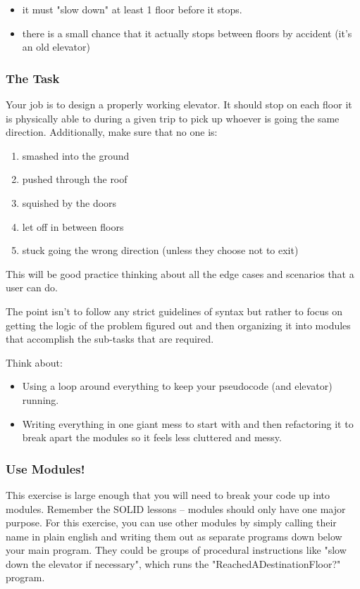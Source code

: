 \documentclass[11pt]{article}
\begin{document}
\begin{itemize}
\item it must "slow down" at least 1 floor before it stops.
\item there is a small chance that it actually stops between floors by 
accident (it's an old elevator)
\end{itemize}

\subsubsection{The Task}
\label{sec-12-1-2}

Your job is to design a properly working elevator. It should stop on each 
floor it is physically able to during a given trip to pick up whoever is 
going the same direction. Additionally, make sure that no one is:

\begin{enumerate}
\item smashed into the ground
\item pushed through the roof
\item squished by the doors
\item let off in between floors
\item stuck going the wrong direction (unless they choose not to exit)
\end{enumerate}


This will be good practice thinking about all the edge cases and scenarios 
that a user can do.

The point isn't to follow any strict guidelines of syntax but rather to 
focus on getting the logic of the problem figured out and then organizing it
into modules that accomplish the sub-tasks that are required.

Think about:

\begin{itemize}
\item Using a loop around everything to keep your pseudocode (and elevator) 
running.
\item Writing everything in one giant mess to start with and then refactoring it
to break apart the modules so it feels less cluttered and messy.
\end{itemize}

\subsubsection{Use Modules!}
\label{sec-12-1-3}

This exercise is large enough that you will need to break your code up into
modules. Remember the SOLID lessons -- modules should only have one major 
purpose. For this exercise, you can use other modules by simply calling 
their name in plain english and writing them out as separate programs down
below your main program. They could be groups of procedural instructions 
like "slow down the elevator if necessary", which runs the 
"ReachedADestinationFloor?" program.
\end{document}
